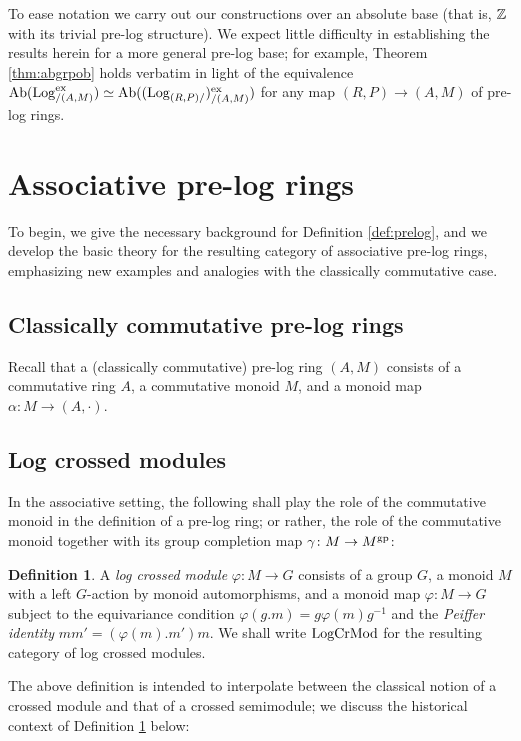 \documentclass[a4paper,10pt%
]{amsart}
\numberwithin{equation}{section}
\theoremstyle{definition}
\newtheorem{definition}[subsection]{Definition}
\renewcommand{\:}{\colon}
\begin{document}
To ease notation we carry out our constructions over an absolute base (that is, ${\Bbb Z}$ with its trivial pre-log structure). We expect little difficulty in establishing the results herein for a more general pre-log base; for example, Theorem \ref{thm:abgrpob} holds verbatim in light of the equivalence ${\rm Ab}({\rm Log}^{\rm ex}_{/(A, M)}) \simeq {\rm Ab}(({\rm Log}_{(R, P)/})^{\rm ex}_{/(A, M)})$ for any map $(R, P) \to (A, M)$ of pre-log rings. 


\section{Associative pre-log rings}\label{sec:assprelog} To begin, we give the necessary background for Definition \ref{def:prelog}, and we develop the basic theory for the resulting category of associative pre-log rings, emphasizing new examples and analogies with the classically commutative case. 

\subsection{Classically commutative pre-log rings} Recall that a (classically commutative) pre-log ring $(A, M)$ consists of a commutative ring $A$, a commutative monoid $M$, and a monoid map $\alpha \colon M \to (A, \cdot)$. 

\subsection{Log crossed modules} In the associative setting, the following shall play the role of the commutative monoid in the definition of a pre-log ring; or rather, the role of the commutative monoid together with its group completion map $\gamma \colon M \to M^{\rm gp}$:  

\begin{definition}\label{def:logcrmod} A \emph{log crossed module} $\varphi \colon M \to G$ consists of a group $G$, a monoid $M$ with a left $G$-action by monoid automorphisms, and a monoid map $\varphi \colon M \to G$ subject to the equivariance condition $\varphi(g.m) = g\varphi(m)g^{-1}$ and the \emph{Peiffer \cite{Pei49} identity} $mm' = (\varphi(m).m')m$. We shall write ${\rm LogCrMod}$ for the resulting category of log crossed modules.
\end{definition}

The above definition is intended to interpolate between the classical notion of a crossed module and that of a crossed semimodule; we discuss the historical context of Definition \ref{def:logcrmod} below:
\end{document}
